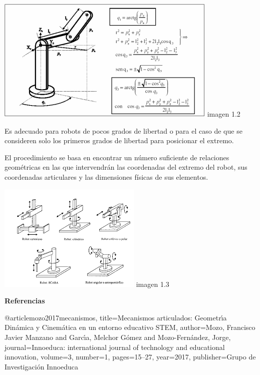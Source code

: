 \documentclass[10pt,a4paper]{article}
\begin{document}
 \begin{center}
\includegraphics[scale=1.2]{imagenes/cinematica.png} imagen 1.2
\end{center}
\begin{large}
Es adecuado para robots de pocos grados de libertad o para el caso de que se consideren solo los primeros grados de libertad para posicionar el extremo.

El procedimiento se basa en encontrar un número suficiente de relaciones geométricas en las que intervendrán las coordenadas del extremo del robot, sus coordenadas articulares y las dimensiones físicas de sus elementos.
\end{large}
\begin{center}
\includegraphics[scale=1.2]{imagenes/recta.png} imagen 1.3
\end{center}

 \begin{huge}
\textbf{Referencias}
\end{huge}
\begin{normalsize}
@article{mozo2017mecanismos,
  title={Mecanismos articulados: Geometr{\'\i}a Din{\'a}mica y Cinem{\'a}tica en un entorno educativo STEM},
  author={Mozo, Francisco Javier Manzano and Garc{\'\i}a, Melchor G{\'o}mez and Mozo-Fern{\'a}ndez, Jorge},
  journal={Innoeduca: international journal of technology and educational innovation},
  volume={3},
  number={1},
  pages={15--27},
  year={2017},
  publisher={Grupo de Investigaci{\'o}n Innoeduca}
}
\end{normalsize}
\end{document}
